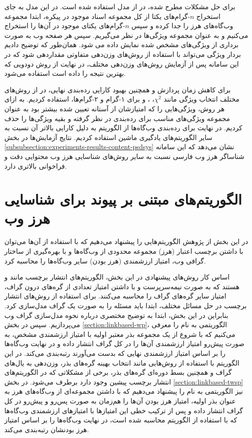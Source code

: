 \documentclass[twoside, a4paper,11pt]{book}
\numberwithin{equation}{chapter}
\numberwithin{table}{chapter}
\numberwithin{figure}{chapter}
\numberwithin{equation}{chapter}
\begin{document}
برای حل مشکلات مطرح شده، در  از مدل  استفاده شده است. در این مدل به جای استخراج $n$-گرام‌های یکتا از کل مجموعه اسناد موجود در پیکره، ابتدا مجموعه وب‌گاه‌های هرز را جدا کرده و سپس $n$-گرام‌های یکتای موجود در آن‌ها را استخراج می‌کنیم و به عنوان مجموعه ویژگی‌ها در نظر می‌گیریم. سپس هر صفحه وب به صورت برداری از ویژگی‌های مشخص شده نمایش داده می شود. همان‌طور که توضیح دادیم بردار ویژگی می‌تواند با استفاده از روش‌های وزن‌دهی متفاوتی مقداردهی شود که در این سامانه پس از آزمایش روش‌های وزن‌دهی مختلف، در نهایت از روش دودویی که بهترین نتیجه را داده است استفاده می‌شود.

برای کاهش زمان پردازش و همچنین بهبود کارایی رده‌بندی نهایی، در  از  روش‌های مختلف انتخاب ویژگی مانند $\chi^2$،  ،  و  برای ۱-گرام و ۲-گرام‌ها، استفاده کردیم. به ازای هر روش، ویژگی‌هایی را که امتیازشان از آستانه تعیین شده بیشتر بود به عنوان مجموعه ویژگی‌های مناسب برای رده‌بندی در نظر گرفته و بقیه ویژگی‌ها را حذف کردیم. در نهایت برای رده‌بندی وب‌گاه‌ها از الگوریتم  به دلیل کارایی بالاتر آن نسبت به سایر الگوریتم‌های یادگیری ماشین استفاده کردیم. نتایج آزمایش‌ها در بخش \ref{subsubsection:experiments-results-content-psdsys} نشان می‌دهد که این سامانه شناساگر هرز وب فارسی نسبت به سایر روش‌های شناسایی هرز وب محتوایی دقت و فراخوانی بالاتری دارد.

\section{الگوریتم‌های مبتنی بر پیوند برای شناسایی هرز وب}
\label{chapter:ٍlinkbased}
در این بخش از پژوهش الگوریتم‌هایی را پیشنهاد می‌دهیم که با استفاده از آن‌ها می‌توان با داشتن برچسب اعتبار  (هرز) مجموعه محدودی از وب‌گاه‌ها و با بهره‌گیری از ساختار گرافی وب، امتیاز ارزشمندی  (هرز بودن) سایر وب‌گاه‌ها را محاسبه کرد. 

اساس کار روش‌های پیشنهادی در این بخش، الگوریتم‌های انتشار برچسب  مانند  و    هستند که به صورت نیمه‌سرپرست و با داشتن امتیاز تعدادی از گره‌های درون گراف، امتیاز سایر گره‌های گراف را محاسبه می‌کنند. برای استفاده از روش‌های انتشار برچسب در حل مسائل مختلف، ابتدا باید مسئله را به صورت یک گراف مدل‌سازی کرد. بنابراین در این بخش، ابتدا به توضیح مختصری درباره نحوه مدل‌سازی گراف وب می‌پردازیم. سپس در بخش \ref{section:linkbased-wp}، الگوریتمی به نام  را معرفی می‌کنیم که با شروع از یک مجموعه بذر معتبر اولیه با امتیاز ارزشمندی مشخص، به صورت پیش‌رو امتیاز ارزشمندی آن‌ها را در کل گراف انتشار داده و در نهایت وب‌گاه‌ها را بر اساس امتیاز ارزشمندی نهایی که بدست می‌آورند رتبه‌بندی می‌کند. در این الگوریتم با استفاده از روش‌هایی مانند انتخاب بهینه گره‌های بذر، وزن‌دهی به یال‌‌های گراف و همچنین بسط دوره‌ای گره‌های بذر، برخی از مشکلاتی که در الگوریتم‌های انتشار برچسب پیشین وجود دارد برطرف می‌شود. در بخش \ref{section:linkbased-twsp} نیز الگوریتمی به نام  را پیشنهاد می‌دهیم که با داشتن مجموعه‌ای از وب‌گاه‌های هرز به عنوان بذر اولیه، امتیاز هرز بودن آن‌ها را هم‌زمان به صورت پس‌رو و پیش‌رو در کل گراف انتشار داده و پس از ترکیب خطی این امتیازها با امتیازهای ارزشمندی وب‌گاه‌ها که با استفاده از الگوریتم  محاسبه شده است، در نهایت وب‌گاه‌ها را بر اساس امتیاز هرز بودنشان رتبه‌بندی می‌کند. 
\end{document}
